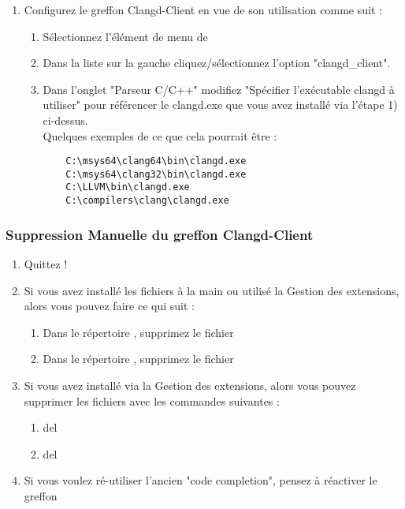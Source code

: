 \begin{enumerate}[noitemsep]
\item Configurez le greffon Clangd-Client en vue de son utilisation comme suit :
    \begin{enumerate}[noitemsep]
    \item Sélectionnez l'élément de menu de \codeblocks {}
    \item Dans la liste sur la gauche cliquez/sélectionnez l'option "clangd\_client".
    \item Dans l'onglet "Parseur C/C++" modifiez "Spécifier l'exécutable clangd à utiliser" pour référencer le clangd.exe que vous avez installé via l'étape 1) ci-dessus. \\ 
     Quelques exemples de ce que cela pourrait être :
    \begin{verbatim}
    C:\msys64\clang64\bin\clangd.exe
    C:\msys64\clang32\bin\clangd.exe
    C:\LLVM\bin\clangd.exe
    C:\compilers\clang\clangd.exe
    \end{verbatim}
    \end{enumerate}
\end{enumerate}

\subsubsection{Suppression Manuelle du greffon Clangd-Client}

\begin{enumerate}[noitemsep]
\item Quittez \codeblocks \hspace{0pt} !
\item Si vous avez installé les fichiers à la main ou utilisé la Gestion des extensions, alors vous pouvez faire ce qui suit :
    \begin{enumerate}[noitemsep]
    \item Dans le répertoire \codeblocks {}, supprimez le fichier 
    \item Dans le répertoire \codeblocks {}, supprimez le fichier 
    \end{enumerate}
\item Si vous avez installé via la Gestion des extensions, alors vous pouvez supprimer les fichiers avec les commandes suivantes :
    \begin{enumerate}[noitemsep]
    \item del 
    \item del 
    \end{enumerate}
\item Si vous voulez ré-utiliser l'ancien "code completion", pensez à réactiver le greffon
\end{enumerate}


